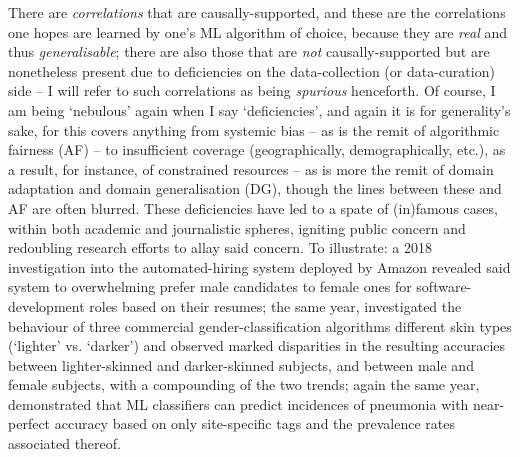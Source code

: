 %
%
There are \emph{correlations} that are causally-supported, and these are the correlations one hopes
are learned by one's ML algorithm of choice, because they are \emph{real} and thus
\emph{generalisable}; there are also those that are \emph{not} causally-supported but are
nonetheless present due to deficiencies on the data-collection (or data-curation) side -- I will
refer to such correlations as being \emph{spurious} henceforth.
%
Of course, I am being `nebulous' again when I say `deficiencies', and again it is for generality's
sake, for this covers anything from systemic bias -- as is the remit of algorithmic fairness (AF)
-- to insufficient coverage (geographically, demographically, etc.), as a result, for instance, of
constrained resources -- as is more the remit of domain adaptation and domain generalisation (DG),
though the lines between these and AF are often blurred.
%
These deficiencies have led to a spate of (in)famous cases, within both academic and journalistic
spheres, igniting public concern and redoubling research efforts to allay said concern.
%
To illustrate: a 2018 investigation \citep{dastin2018amazon} into the automated-hiring system
deployed by Amazon revealed said system to overwhelming prefer male candidates to female ones for
software-development roles based on their resumes; the same year, \cite{buolamwini2018gender}
investigated the behaviour of three commercial gender-classification algorithms \wrt{} different
skin types (`lighter' vs. `darker') and observed marked disparities in the resulting accuracies
between lighter-skinned and darker-skinned subjects, and between male and female subjects, with a
compounding of the two trends; again the same year, \cite{zech2018variable} demonstrated that ML
classifiers can predict incidences of pneumonia with near-perfect accuracy based on only
site-specific tags and the prevalence rates associated thereof.

